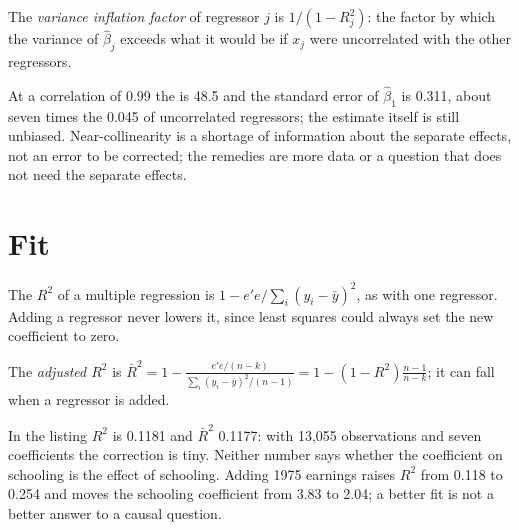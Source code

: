 \begin{definition}\label{def:b2:multiple-regression:vif}
The \emph{variance inflation factor} of regressor $j$ is $1/(1 - R_j^2)$: the factor by
which the variance of $\hat\beta_j$ exceeds what it would be if $x_j$ were uncorrelated with the other regressors.
\end{definition}

\label{lst:b2:multiple-regression:collinearity}

\label{out:b2:multiple-regression:collinearity}

At a correlation of 0.99 the  is 48.5 and the standard error of $\hat\beta_1$ is 0.311, about
seven times the 0.045 of uncorrelated regressors; the estimate itself is still unbiased. Near-collinearity is a shortage
of information about the separate effects, not an error to be corrected; the remedies are more data or a question that
does not need the separate effects.

\section{Fit}\label{sec:b2:multiple-regression:fit}

The $R^2$ of a multiple regression is $1 - e'e/\sum_i(y_i - \bar y)^2$, as with one regressor. Adding a regressor never
lowers it, since least squares could always set the new coefficient to zero.

\begin{definition}\label{def:b2:multiple-regression:adjusted-r2}
The \emph{adjusted $R^2$} is $\bar R^2 = 1 - \frac{e'e/(n - k)}{\sum_i(y_i - \bar y)^2/(n -
1)} = 1 - (1 - R^2)\frac{n - 1}{n - k}$; it can fall when a regressor is added.
\end{definition}

In the listing $R^2$ is 0.1181 and $\bar R^2$ 0.1177: with 13,055 observations and seven coefficients the correction is
tiny. Neither number says whether the coefficient on schooling is the effect of schooling. Adding 1975 earnings raises
$R^2$ from 0.118 to 0.254 and moves the schooling coefficient from 3.83 to 2.04; a better fit is not a better answer to a causal
question.

